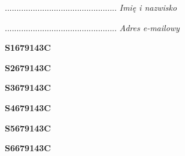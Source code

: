 \begin{turn}{90}\begin{minipage}{\linewidth} \vspace{20mm} ................................................  \textit{Imię i nazwisko}\end{minipage}\end{turn}

\begin{turn}{90}\begin{minipage}{\linewidth} \vspace{20mm} ................................................  \textit{Adres e-mailowy}\end{minipage}\end{turn}

\begin{turn}{90}\huge \begin{minipage}{\linewidth} \vspace{10mm}\textbf{S1679143C}\end{minipage}\end{turn}

\begin{turn}{90}\huge \begin{minipage}{\linewidth} \vspace{10mm}\textbf{S2679143C}\end{minipage}\end{turn}

\begin{turn}{90}\huge \begin{minipage}{\linewidth} \vspace{10mm}\textbf{S3679143C}\end{minipage}\end{turn}

\begin{turn}{90}\huge \begin{minipage}{\linewidth} \vspace{10mm}\textbf{S4679143C}\end{minipage}\end{turn}

\begin{turn}{90}\huge \begin{minipage}{\linewidth} \vspace{10mm}\textbf{S5679143C}\end{minipage}\end{turn}

\begin{turn}{90}\huge \begin{minipage}{\linewidth} \vspace{10mm}\textbf{S6679143C}\end{minipage}\end{turn}

